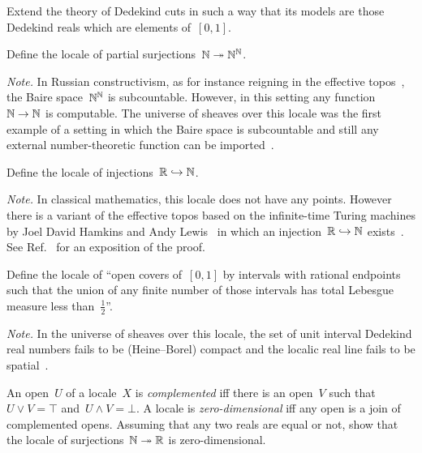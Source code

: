 \documentclass{ws-rv9x6}
\begin{document}
{\begin{exercise}%
Extend the theory of Dede\-kind cuts in such a way that its models are those
Dedekind reals which are elements of~$[0,1]$.
\end{exercise}

\begin{exercise}%
\label{ex:exotic-locales}%
\begin{alphlist}[(d)]
\item Define the locale of partial surjections~$\mathbb{N} \twoheadrightarrow \mathbb{N}^{\mathbb{N}}$.\smallskip

{\scriptsize\emph{Note.} In Russian constructivism, as for instance reigning in
the ef{}fective topos~\cite{hyland:effective-topos,phoa:effective,bauer:c2c}, the Baire space~$\mathbb{N}^{\mathbb{N}}$ is subcountable.
However, in this setting any function~$\mathbb{N} \to \mathbb{N}$ is computable.
The universe of sheaves over this locale was the first example of a setting in
which the Baire space is subcountable and still any external number-theoretic
function can be imported~\cite[Section~4.3]{scedrov:forcing}.\par}
\item Define the locale of injections~$\mathbb{R} \hookrightarrow \mathbb{N}$.\smallskip

{\scriptsize\emph{Note.} In classical mathematics, this locale does not have
any points. However there is a variant of the ef{}fective topos based on the
infinite-time Turing machines by Joel David Hamkins and Andy
Lewis~\cite{hamkins-lewis:ittm} in which an injection~$\mathbb{R} \hookrightarrow \mathbb{N}$
exists~\cite{bauer:injection}. See
Ref.~\cite[Section~2.2]{blechschmidt:custom-tailored} for an exposition of the
proof.\par}

\item Define the locale of ``open covers of~$[0,1]$ by intervals with rational
endpoints such that the union of any finite number of those intervals has total
Lebesgue measure less than~$\frac{1}{2}$''.\smallskip

{\scriptsize\emph{Note.} In the universe of sheaves over this locale, the set
of unit interval Dedekind real numbers fails to be (Heine--Borel) compact and
the localic real line fails to be
spatial~\cite[Example~D4.7.13]{johnstone:elephant}.\par}
\item An open~$U$ of a locale~$X$ is \emph{complemented} iff there is an
open~$V$ such that~$U \vee V = \top$ and~$U \wedge V = \bot$. A locale is
\emph{zero-dimensional} iff any open is a join of complemented opens. Assuming
that any two reals are equal or not, show that the locale of surjections~$\mathbb{N}
\twoheadrightarrow \mathbb{R}$ is zero-dimensional.
\end{alphlist}
\end{exercise}

}
\end{document}
